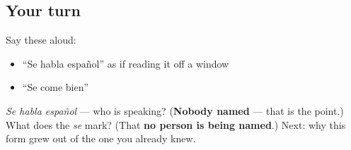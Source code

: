 \subsection*{Your turn}
Say these aloud:

\begin{itemize}
\raggedright
  \item \textquotedblleft{}Se habla español\textquotedblright{} as if reading it off a window
  \item \textquotedblleft{}Se come bien\textquotedblright{}
\end{itemize}

\begin{tcolorbox}[breakable,colback=teal!4,colframe=teal!35!black,title={Before you move on}]
\emph{Se habla español} — who is speaking? (\textbf{Nobody named} — that is the point.) What does the \emph{se} mark? (That \textbf{no person is being named}.) Next: why this form grew out of the one you already knew.
\end{tcolorbox}
